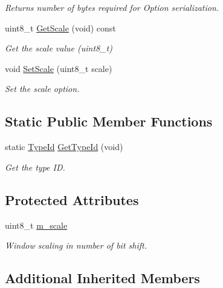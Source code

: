 \begin{DoxyCompactItemize}
\begin{DoxyCompactList}\small\item\em Returns number of bytes required for Option serialization. \end{DoxyCompactList}\item 
uint8\+\_\+t \hyperlink{classns3_1_1TcpOptionWinScale_a53c0df5957a2497da716830f6e190b8e}{Get\+Scale} (void) const 
\begin{DoxyCompactList}\small\item\em Get the scale value (uint8\+\_\+t) \end{DoxyCompactList}\item 
void \hyperlink{classns3_1_1TcpOptionWinScale_a726c4215fdc53f31584bee662c9d39b0}{Set\+Scale} (uint8\+\_\+t scale)
\begin{DoxyCompactList}\small\item\em Set the scale option. \end{DoxyCompactList}\end{DoxyCompactItemize}
\subsection*{Static Public Member Functions}
\begin{DoxyCompactItemize}
\item 
static \hyperlink{classns3_1_1TypeId}{Type\+Id} \hyperlink{classns3_1_1TcpOptionWinScale_ad332862562eccfa680baff8dc0f21e48}{Get\+Type\+Id} (void)
\begin{DoxyCompactList}\small\item\em Get the type ID. \end{DoxyCompactList}\end{DoxyCompactItemize}
\subsection*{Protected Attributes}
\begin{DoxyCompactItemize}
\item 
uint8\+\_\+t \hyperlink{classns3_1_1TcpOptionWinScale_aaf309f353a9be35cc3aead34876340d0}{m\+\_\+scale}
\begin{DoxyCompactList}\small\item\em Window scaling in number of bit shift. \end{DoxyCompactList}\end{DoxyCompactItemize}
\subsection*{Additional Inherited Members}


